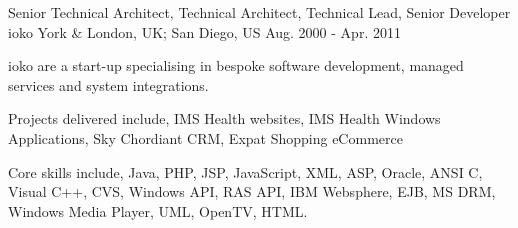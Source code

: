 \begin{cventries}

\cvexpentry
{Senior Technical Architect, Technical Architect, Technical Lead, Senior Developer} %
{ioko} %
{York \& London, UK; San Diego, US} %
{Aug. 2000 - Apr. 2011} %
{
\begin{cvitemstitle}
\item {ioko are a start-up specialising in bespoke software development, managed services and system integrations.}
\end{cvitemstitle}
}
{ %
\begin{cvitems}
\item {Projects delivered include, IMS Health websites, IMS Health Windows Applications, Sky Chordiant CRM, Expat Shopping eCommerce}
\item {Core skills include, Java, PHP, JSP, JavaScript, XML, ASP, Oracle, ANSI C, Visual C++, CVS, Windows API, RAS API, IBM Websphere, EJB, MS DRM, Windows Media Player, UML, OpenTV, HTML.}
\end{cvitems}
}


\end{cventries}
